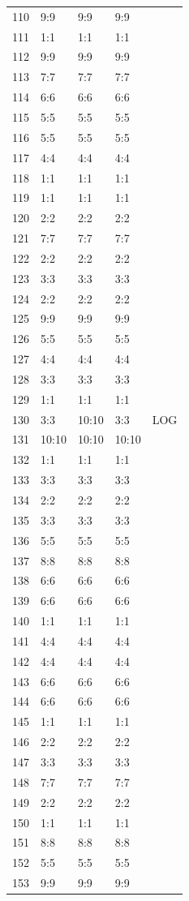 \documentclass{report}
\begin{document}
\begin{center}
\begin{longtable}{|l|l|l|l|l|}
110&9:9&9:9&9:9&\\
111&1:1&1:1&1:1&\\
112&9:9&9:9&9:9&\\
113&7:7&7:7&7:7&\\
114&6:6&6:6&6:6&\\
115&5:5&5:5&5:5&\\
116&5:5&5:5&5:5&\\
117&4:4&4:4&4:4&\\
118&1:1&1:1&1:1&\\
119&1:1&1:1&1:1&\\
120&2:2&2:2&2:2&\\
121&7:7&7:7&7:7&\\
122&2:2&2:2&2:2&\\
123&3:3&3:3&3:3&\\
124&2:2&2:2&2:2&\\
125&9:9&9:9&9:9&\\
126&5:5&5:5&5:5&\\
127&4:4&4:4&4:4&\\
128&3:3&3:3&3:3&\\
129&1:1&1:1&1:1&\\
130&3:3&10:10&3:3&LOG\\
131&10:10&10:10&10:10&\\
132&1:1&1:1&1:1&\\
133&3:3&3:3&3:3&\\
134&2:2&2:2&2:2&\\
135&3:3&3:3&3:3&\\
136&5:5&5:5&5:5&\\
137&8:8&8:8&8:8&\\
138&6:6&6:6&6:6&\\
139&6:6&6:6&6:6&\\
140&1:1&1:1&1:1&\\
141&4:4&4:4&4:4&\\
142&4:4&4:4&4:4&\\
143&6:6&6:6&6:6&\\
144&6:6&6:6&6:6&\\
145&1:1&1:1&1:1&\\
146&2:2&2:2&2:2&\\
147&3:3&3:3&3:3&\\
148&7:7&7:7&7:7&\\
149&2:2&2:2&2:2&\\
150&1:1&1:1&1:1&\\
151&8:8&8:8&8:8&\\
152&5:5&5:5&5:5&\\
153&9:9&9:9&9:9&\\

\end{longtable}
\end{center}
\end{document}

